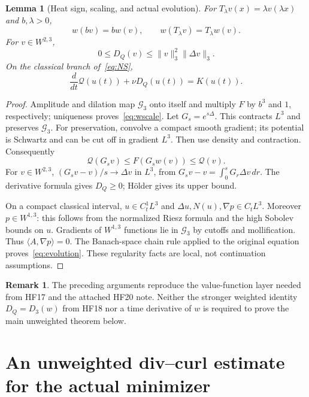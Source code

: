 \documentclass[11pt,a4paper]{article}
\newtheorem{lemma}[theorem]{Lemma}
\theoremstyle{definition}
\newtheorem{remark}[theorem]{Remark}
\newcommand{\G}{\mathcal G_3}
\newcommand{\Q}{\mathcal Q}
\newcommand{\ip}[2]{\langle #1,#2\rangle}
\begin{document}
\begin{lemma}[Heat sign, scaling, and actual evolution]\label{lem:evolution}
For $T_\lambda v(x)=\lambda v(\lambda x)$ and $b,\lambda>0$,
\begin{equation}\label{eq:wscale}
 w(bv)=bw(v),\qquad w(T_\lambda v)=T_\lambda w(v).
\end{equation}
For $v\in W^{2,3}$,
\begin{equation}\label{eq:heatbound}
 0\le D_Q(v)\le\|v\|_3^2\|\Delta v\|_3.
\end{equation}
On the classical branch of~\eqref{eq:NS},
\begin{equation}\label{eq:evolution}
 \frac{d}{dt}\Q(u(t))+\nu D_Q(u(t))=K(u(t)).
\end{equation}
\end{lemma}
\begin{proof}
Amplitude and dilation map $\G$ onto itself and multiply $F$ by $b^3$ and $1$, respectively; uniqueness proves~\eqref{eq:wscale}. Let $G_s=e^{s\Delta}$. This contracts $L^3$ and preserves $\G$. For preservation, convolve a compact smooth gradient; its potential is Schwartz and can be cut off in gradient $L^3$. Then use density and contraction. Consequently
\[
 \Q(G_sv)\le F(G_sw(v))\le\Q(v).
\]
For $v\in W^{2,3}$, $(G_sv-v)/s\to\Delta v$ in $L^3$, from
$G_sv-v=\int_0^sG_r\Delta v\,dr$. The derivative formula gives $D_Q\ge0$; H\"older gives its upper bound.

On a compact classical interval, $u\in C^1_tL^3$ and $\Delta u,N(u),\nabla p\in C_tL^3$. Moreover $p\in W^{1,3}$: this follows from the normalized Riesz formula and the high Sobolev bounds on $u$. Gradients of $W^{1,3}$ functions lie in $\G$ by cutoffs and mollification. Thus $\ip{A}{\nabla p}=0$. The Banach-space chain rule applied to the original equation proves~\eqref{eq:evolution}. These regularity facts are local, not continuation assumptions.
\end{proof}

\begin{remark}
The preceding arguments reproduce the value-function layer needed from HF17 and the attached HF20 note. Neither the stronger weighted identity $D_Q=D_3(w)$ from HF18 nor a time derivative of $w$ is required to prove the main unweighted theorem below.
\end{remark}

\section{An unweighted div--curl estimate for the actual minimizer}\label{sec:regularity}
\end{document}
